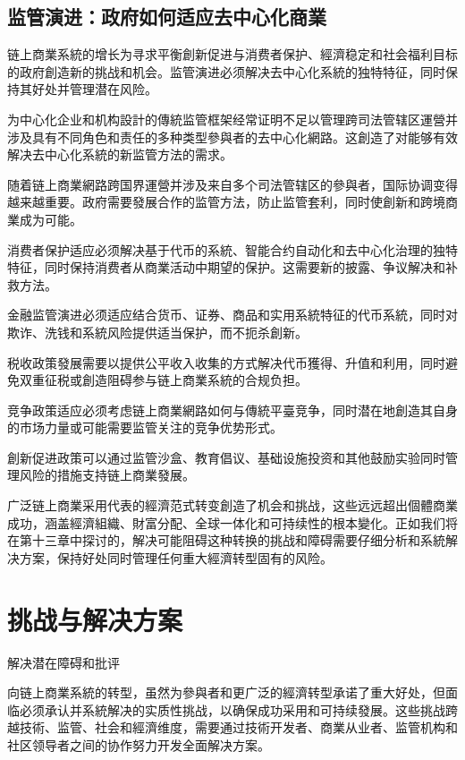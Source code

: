 \documentclass[
  Letterpaper,
]{scrbook}
\begin{document}
\section{监管演进：政府如何适应去中心化商業}\label{ux76d1ux7ba1ux6f14ux8fdbux653fux5e9cux5982ux4f55ux9002ux5e94ux53bbux4e2dux5fc3ux5316ux5546ux696d}

链上商業系統的增长为寻求平衡創新促进与消费者保护、經濟稳定和社会福利目标的政府創造新的挑战和机会。监管演进必须解决去中心化系統的独特特征，同时保持其好处并管理潜在风险。

为中心化企业和机构設計的傳統监管框架经常证明不足以管理跨司法管辖区運營并涉及具有不同角色和责任的多种类型參與者的去中心化網路。这創造了对能够有效解决去中心化系統的新监管方法的需求。

随着链上商業網路跨国界運營并涉及来自多个司法管辖区的參與者，国际协调变得越来越重要。政府需要發展合作的监管方法，防止监管套利，同时使創新和跨境商業成为可能。

消费者保护适应必须解决基于代币的系統、智能合约自动化和去中心化治理的独特特征，同时保持消费者从商業活动中期望的保护。这需要新的披露、争议解决和补救方法。

金融监管演进必须适应结合货币、证券、商品和实用系統特征的代币系統，同时对欺诈、洗钱和系統风险提供适当保护，而不扼杀創新。

税收政策發展需要以提供公平收入收集的方式解决代币獲得、升值和利用，同时避免双重征税或創造阻碍参与链上商業系統的合规负担。

竞争政策适应必须考虑链上商業網路如何与傳統平臺竞争，同时潜在地創造其自身的市场力量或可能需要监管关注的竞争优势形式。

創新促进政策可以通过监管沙盒、教育倡议、基础设施投资和其他鼓励实验同时管理风险的措施支持链上商業發展。

广泛链上商業采用代表的經濟范式转变創造了机会和挑战，这些远远超出個體商業成功，涵盖經濟組織、財富分配、全球一体化和可持续性的根本變化。正如我们将在第十三章中探讨的，解决可能阻碍这种转换的挑战和障碍需要仔细分析和系統解决方案，保持好处同时管理任何重大經濟转型固有的风险。

\chapter{挑战与解决方案}\label{sec-challenges-solutions}

解决潜在障碍和批评

向链上商業系統的转型，虽然为參與者和更广泛的經濟转型承诺了重大好处，但面临必须承认并系統解决的实质性挑战，以确保成功采用和可持续發展。这些挑战跨越技術、监管、社会和經濟维度，需要通过技術开发者、商業从业者、监管机构和社区领导者之间的协作努力开发全面解决方案。
\end{document}
